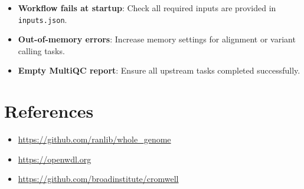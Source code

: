 \documentclass[13pt,letter]{article}
\begin{document}
\begin{itemize}
  \item \textbf{Workflow fails at startup}: Check all required inputs are provided in \texttt{inputs.json}.
  \item \textbf{Out-of-memory errors}: Increase memory settings for alignment or variant calling tasks.
  \item \textbf{Empty MultiQC report}: Ensure all upstream tasks completed successfully.
\end{itemize}

\section{References}

\begin{itemize}
  \item \url{https://github.com/ranlib/whole_genome}
  \item \url{https://openwdl.org}
  \item \url{https://github.com/broadinstitute/cromwell}
\end{itemize}
\end{document}
